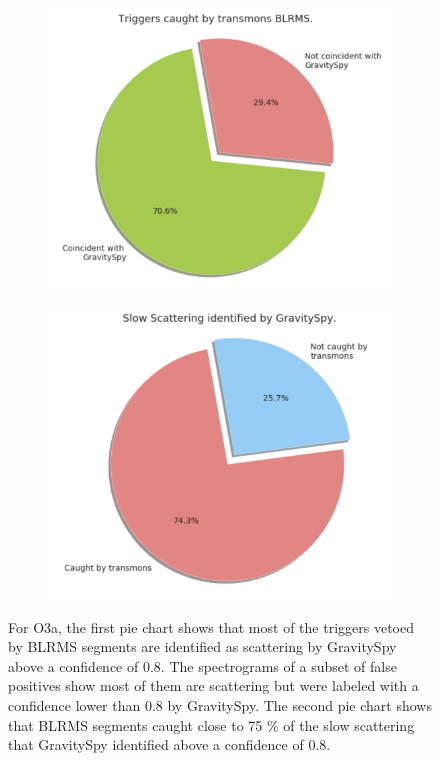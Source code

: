 \documentclass[12pt]{iopart}
\begin{document}
\begin{figure}[h]
   \centering
    \begin{subfigure}[b]{0.45\textwidth}
        \centering
         \includegraphics[width= \textwidth]{transmonvetoed.png}
         \caption{}
         \label{fig:transpie}
    \end{subfigure}
    \hfill
    \begin{subfigure}[b]{0.44\textwidth}
        \centering
         \includegraphics[width =\textwidth]{gspyvetoed.png}
         \caption{}
         \label{fig:gspypie}
         
    
    \end{subfigure}
    \caption{For O3a, the first pie chart shows that most of the triggers vetoed by  BLRMS segments are identified as scattering by GravitySpy above a confidence of 0.8. The spectrograms of a subset of false positives show most of them are scattering but were labeled with a confidence lower than 0.8 by GravitySpy. The second pie chart shows that BLRMS segments caught close to 75 \% of the slow scattering that GravitySpy identified above a confidence of 0.8.}
    \label{fig:gspytrans}
    
\end{figure}
\end{document}
